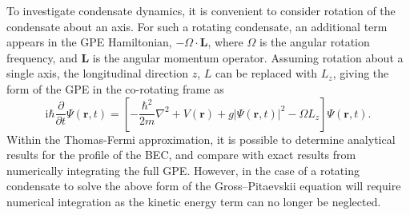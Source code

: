 To investigate condensate dynamics, it is convenient to consider rotation of the condensate about an axis. For such a rotating condensate, an additional term appears in the GPE Hamiltonian, $-\Omega\cdot \mathbf{L}$, where $\Omega$ is the angular rotation frequency, and $\mathbf{L}$ is the angular momentum operator. Assuming rotation about a single axis, the longitudinal direction $z$, $L$ can be replaced with $L_z$, giving the form of the GPE in the co-rotating frame as
\begin{equation}\label{eqn:gpe_rotation}
\textrm{i}\hbar\frac{\partial}{\partial t}\Psi(\mathbf{r},t) = \left[-\frac{\hbar^2}{2m}\nabla^2 + V(\mathbf{r}) + g\vert\Psi(\textbf{r},t)\vert^2 - \Omega L_z  \right]\Psi(\mathbf{r},t).
\end{equation}
Within the Thomas-Fermi approximation, it is possible to determine analytical results for the profile of the BEC, and compare with exact results from numerically integrating the full GPE. However, in the case of a rotating condensate to solve the above form of the Gross--Pitaevskii equation will require numerical integration as the kinetic energy term can no longer be neglected.

